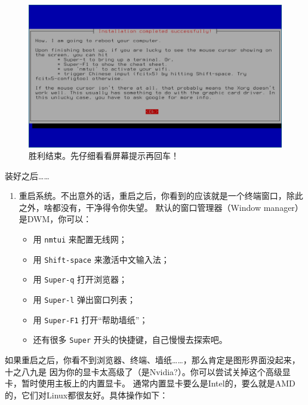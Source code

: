 \documentclass{wx672ctexart} \usepackage{hyperref}
\begin{document}
\begin{enumerate}
\begin{enumerate}
\begin{figure}[htbp]
\centering
\includegraphics[width=.5\linewidth]{screenshots/46.png}
\caption{胜利结束。先仔细看看屏幕提示再回车！}
\end{figure}
\end{enumerate}
\end{enumerate}


装好之后……

\begin{enumerate}
\item 重启系统。不出意外的话，重启之后，你看到的应该就是一个终端窗口，除此之外，啥都没有，干净得令你失望。
默认的窗口管理器（Window manager）是DWM，你可以：
\begin{itemize}
\item 用 \texttt{nmtui} 来配置无线网；
\item 用 \texttt{Shift-space} 来激活中文输入法；
\item 用 \texttt{Super-q} 打开浏览器；
\item 用 \texttt{Super-l} 弹出窗口列表；
\item 用 \texttt{Super-F1} 打开“帮助墙纸”；
\item 还有很多 \texttt{Super} 开头的快捷键，自己慢慢去探索吧。
\end{itemize}
\end{enumerate}

如果重启之后，你看不到浏览器、终端、墙纸……，那么肯定是图形界面没起来，十之八九是
因为你的显卡太高级了（是Nvidia?）。你可以尝试关掉这个高级显卡，暂时使用主板上的内置显卡。
通常内置显卡要么是Intel的，要么就是AMD的，它们对Linux都很友好。具体操作如下：
\end{document}
